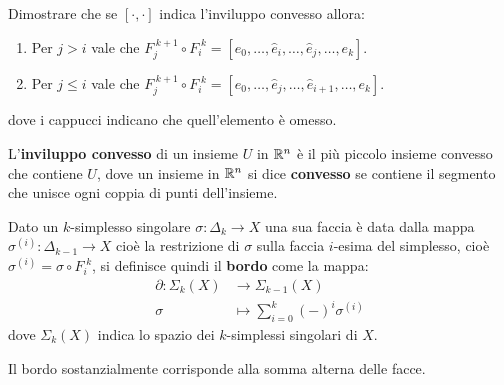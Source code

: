 
\begin{exercise}
  Dimostrare che se $ [\cdot, \cdot] $ indica l'inviluppo convesso allora:
  \begin{enumerate}
  \item Per $ j > i $ vale che $ F_j^{\; k+1} \circ F_i^{\; k} = [e_0, \dots, \hat{e}_i, \dots, \hat{e}_j, \dots, e_k ] $.
  \item Per $ j \leq i $ vale che $ F_j^{\; k+1} \circ F_i^{\; k} = [e_0, \dots, \hat{e}_j, \dots, \hat{e}_{i+1}, \dots, e_k ] $.
  \end{enumerate}
  dove i cappucci indicano che quell'elemento è omesso.
\end{exercise}

\begin{definition}
  L'\textbf{inviluppo convesso} di un insieme $ U $ in
  $ \mathbb{R}^{n} $ è il più piccolo insieme convesso che contiene $ U $, dove un
  insieme in $ \mathbb{R}^{n} $ si dice \textbf{convesso} se
  contiene il segmento che unisce ogni coppia di punti dell'insieme.
\end{definition}

\begin{definition}
  Dato un $ k $-simplesso singolare $ \sigma: \Delta_k \to X $ una sua faccia è data dalla
  mappa $ \sigma^{(i)} \colon \Delta_{k-1} \to X $ cioè la restrizione di
  $ \sigma $ sulla faccia $ i $-esima del simplesso, cioè
  $ \sigma^{(i)} = \sigma \circ F_i^{\; k} $, si definisce quindi il
  \textbf{bordo} come la mappa:
  \begin{align*}
    \partial \colon \Sigma_k(X) & \to \Sigma_{k-1}(X) \\
    \sigma & \mapsto  \sum_{i=0}^{k}(-)^i \sigma^{(i)}
  \end{align*}
  dove $ \Sigma_k(X) $ indica lo spazio dei $ k $-simplessi singolari di $ X $.
\end{definition}
Il bordo sostanzialmente corrisponde alla somma alterna delle facce.


